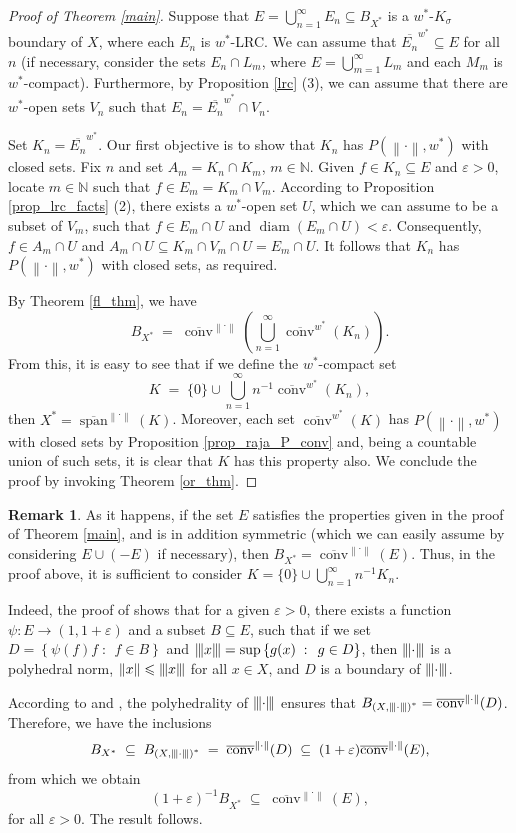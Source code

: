 \documentclass[12pt,reqno]{amsart}
\newcommand{\ball}[1]{\ensuremath{B_{#1}}}
\newcommand{\cl}[1]{\ensuremath{\overline{{#1}}}}
\newcommand{\diam}[1]{\ensuremath{\sdiam{\left({#1}\right)}}}
\newcommand{\dual}[1]{\ensuremath{{#1}^*}}
\newcommand{\ep}{\varepsilon}
\newcommand{\map}[3]{\ensuremath{{#1}:{#2}\to{#3}}}
\newcommand{\n}[1]{\ensuremath{\left\|{#1}\right\|}}
\newcommand{\N}{\mathbb{N}}
\newcommand{\ndot}{\ensuremath{\left\|\cdot\right\|}}
\newcommand{\set}[2]{\ensuremath{\left\{{#1}\;:\;\,{#2}\right\}}}
\newcommand{\tn}[1]{\ensuremath{\left|\kern-.9pt\left|\kern-.9pt\left|{#1}\right|\kern-.9pt\right|\kern-.9pt\right|}}
\newcommand{\tndot}{\ensuremath{\left|\kern-.9pt\left|\kern-.9pt\left|\cdot\right|\kern-.9pt\right|\kern-.9pt\right|}}
\newcommand{\ttri}{|\kern-.9pt|\kern-.9pt|}
\newcommand{\ttrin}{\ttri\cdot\ttri}
\DeclareMathOperator{\aspan}{span}
\DeclareMathOperator{\conv}{conv}
\DeclareMathOperator{\sdiam}{diam}
\theoremstyle{definition}
\newtheorem{rem}[thm]{Remark}
\begin{document}
\begin{proof}[Proof of Theorem \ref{main}]
Suppose that $E = \bigcup_{n=1}^\infty E_n \subseteq \ball{\dual{X}}$ is a $w^*$-$K_\sigma$ boundary of $X$, where each $E_n$ is $w^*$-LRC. We can assume that $\cl{E_n}^{w^*} \subseteq E$ for all $n$ (if necessary, consider the sets $E_n \cap L_m$, where $E= \bigcup_{m=1}^\infty L_m$ and each $M_m$ is $w^*$-compact). Furthermore, by Proposition \ref{lrc} (3), we can assume that there are $w^*$-open sets $V_n$ such that $E_n = \cl{E_n}^{w^*} \cap V_n$.

Set $K_n = \cl{E_n}^{w^*}$. Our first objective is to show that $K_n$ has $P(\ndot,w^*)$ with closed sets. Fix $n$ and set $A_m = K_n \cap K_m$, $m\in\N$. Given $f \in K_n \subseteq E$ and $\ep>0$, locate $m\in\N$ such that $f \in E_m = K_m \cap V_m$. According to Proposition \ref{prop_lrc_facts} (2), there exists a $w^*$-open set $U$, which we can assume to be a subset of $V_m$, such that $f \in E_m \cap U$ and $\diam{E_m \cap U} < \ep$. Consequently, $f \in A_m \cap U$ and $A_m \cap U \subseteq K_m \cap V_m \cap U = E_m \cap U$. It follows that $K_n$ has $P(\ndot,w^*)$ with closed sets, as required.

By Theorem \ref{fl_thm}, we have
\[
B_{X^*} \;=\; \cl{\conv}^{\ndot}\left(\bigcup_{n=1}^\infty \cl{\conv}^{w^*}(K_n) \right).
\]
From this, it is easy to see that if we define the $w^*$-compact set
\[
K \;=\; \{0\} \cup \bigcup_{n=1}^\infty n^{-1}\cl{\conv}^{w^*}(K_n),
\]
then $\dual{X} = \cl{\aspan}^{\ndot}(K)$. Moreover, each set $\cl{\conv}^{w^*}(K)$ has $P(\ndot,w^*)$ with closed sets by Proposition \ref{prop_raja_P_conv} and, being a countable union of such sets, it is clear that $K$ has this property also. We conclude the proof by invoking Theorem \ref{or_thm}.
\end{proof}

\begin{rem}
As it happens, if the set $E$ satisfies the properties given in the proof of
Theorem \ref{main}, and is in addition symmetric (which we can easily assume by considering $E \cup (-E)$ if necessary), then $\ball{\dual{X}} = \cl{\conv}^{\ndot}(E)$. Thus, in the proof above, it is sufficient to consider $K = \{0\} \cup \bigcup_{n=1}^\infty n^{-1} K_n$.

Indeed, the proof of \cite[Theorem 7]{fpst:14} shows that for a given $\ep>0$, there exists a function $\map{\psi}{E}{(1,1+\ep)}$ and a subset $B \subseteq E$, such that if we set $D=\set{\psi(f)f}{f \in B}$ and $\tn{x}=\sup\set{g(x)}{g \in D}$, then $\tndot$ is a polyhedral norm, $\n{x} \leqslant \tn{x}$ for all $x \in X$, and $D$ is a boundary of $\tndot$.

According to \cite[Theorem 3.9]{fonf:00} and \cite[Theorem 2]{vesely:00}, the polyhedrality of $\tndot$ ensures that $\ball{\dual{(X,\ttrin)}} =
\cl{\conv}^{\ndot}(D)$. Therefore, we have the inclusions
\[
\ball{\dual{X}} \;\subseteq\; \ball{\dual{(X,\ttrin)}} \;=\; \cl{\conv}^{\ndot}(D)
\;\subseteq\; (1+\ep)\cl{\conv}^{\ndot}(E),
\]
from which we obtain
\[
(1+\ep)^{-1}\ball{\dual{X}} \;\subseteq\; \cl{\conv}^{\ndot}(E),
\]
for all $\ep>0$. The result follows.
\end{rem}
\end{document}
